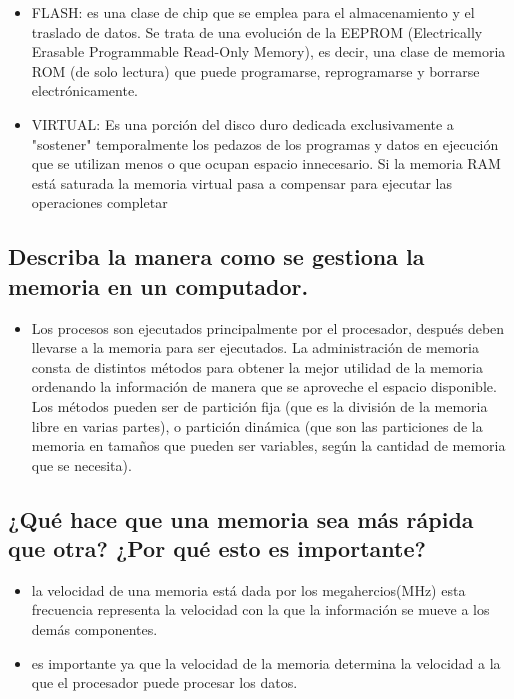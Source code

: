 \documentclass{article}
\begin{document}
\begin{itemize}
        \item{}FLASH: es una clase de chip que se emplea para el almacenamiento y el traslado de datos. Se trata de una evolución de la EEPROM (Electrically Erasable Programmable Read-Only Memory), es decir, una clase de memoria ROM (de solo lectura) que puede programarse, reprogramarse y borrarse electrónicamente.\cite{tiposdememoria}
        
        
        \item{}VIRTUAL: Es una porción del disco duro dedicada exclusivamente a "sostener" temporalmente los pedazos de los programas y datos en ejecución que se utilizan menos o que ocupan espacio innecesario. Si la memoria RAM está saturada la memoria virtual pasa a compensar para ejecutar las operaciones completar\cite{Referencia}
        \end{itemize}
\subsection{Describa la manera como se gestiona la memoria en un computador.}
    \begin{itemize} \item{}
    Los procesos son ejecutados principalmente por el procesador, después deben llevarse a la memoria para ser ejecutados.
    La administración de memoria consta de distintos métodos para obtener la mejor utilidad de la memoria ordenando la información de manera que se aproveche el espacio disponible. Los métodos pueden ser de partición fija (que es la división de la memoria libre en varias partes), o partición dinámica (que son las particiones de la memoria en tamaños que pueden ser variables, según la cantidad de memoria que se necesita).\cite{admin_memoria}
    \cite{Referencia}
    \end{itemize}

\subsection{¿Qué hace que una memoria sea más rápida que otra? ¿Por qué esto es importante?}
    \begin{itemize} 
    \item{}la velocidad de una memoria está dada por los megahercios(MHz) esta frecuencia representa la velocidad con la que la información se mueve a los demás componentes.\cite{graficas}
    \item{}es importante ya que la velocidad de la memoria determina la velocidad a la que el procesador puede procesar los datos. \cite{graficas}
    \end{itemize}
\pagebreak
\end{document}

